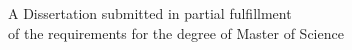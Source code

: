 \thispagestyle{empty}
A Dissertation submitted in partial fulfillment\\
of the requirements for the degree of Master of Science



\hfill

\vfill

%
%
%
%
%
